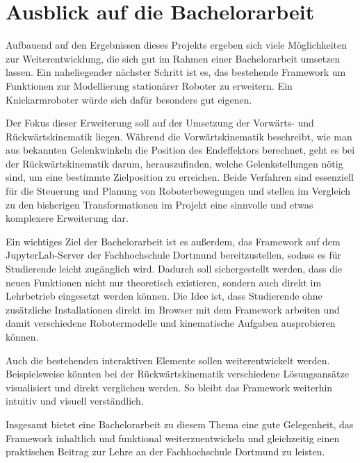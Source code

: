 \section{Ausblick auf die Bachelorarbeit}

Aufbauend auf den Ergebnissen dieses Projekts ergeben sich viele Möglichkeiten zur Weiterentwicklung, die sich gut im Rahmen einer Bachelorarbeit umsetzen lassen.
Ein naheliegender nächster Schritt ist es, das bestehende Framework um Funktionen zur Modellierung stationärer Roboter zu erweitern. Ein Knickarmroboter würde sich dafür besonders gut eigenen.

Der Fokus dieser Erweiterung soll auf der Umsetzung der Vorwärts- und Rückwärtskinematik liegen. Während die Vorwärtskinematik beschreibt,
wie man aus bekannten Gelenkwinkeln die Position des Endeffektors berechnet, geht es bei der Rückwärtskinematik darum, herauszufinden,
welche Gelenkstellungen nötig sind, um eine bestimmte Zielposition zu erreichen.
Beide Verfahren sind essenziell für die Steuerung und Planung von Roboterbewegungen und stellen im
Vergleich zu den bisherigen Transformationen im Projekt eine sinnvolle und etwas komplexere Erweiterung dar.

Ein wichtiges Ziel der Bachelorarbeit ist es außerdem, das Framework auf dem JupyterLab-Server der Fachhochschule Dortmund bereitzustellen,
sodass es für Studierende leicht zugänglich wird. Dadurch soll sichergestellt werden, dass die neuen Funktionen nicht nur theoretisch existieren,
sondern auch direkt im Lehrbetrieb eingesetzt werden können. Die Idee ist,
dass Studierende ohne zusätzliche Installationen direkt im Browser mit dem Framework arbeiten und damit verschiedene Robotermodelle und kinematische Aufgaben ausprobieren können.

Auch die bestehenden interaktiven Elemente sollen weiterentwickelt werden.
Beispielsweise könnten bei der Rückwärtskinematik verschiedene Lösungsansätze visualisiert und direkt verglichen werden.
So bleibt das Framework weiterhin intuitiv und visuell verständlich.

Insgesamt bietet eine Bachelorarbeit zu diesem Thema eine gute Gelegenheit,
das Framework inhaltlich und funktional weiterzuentwickeln und gleichzeitig einen praktischen Beitrag zur Lehre an der Fachhochschule Dortmund zu leisten.